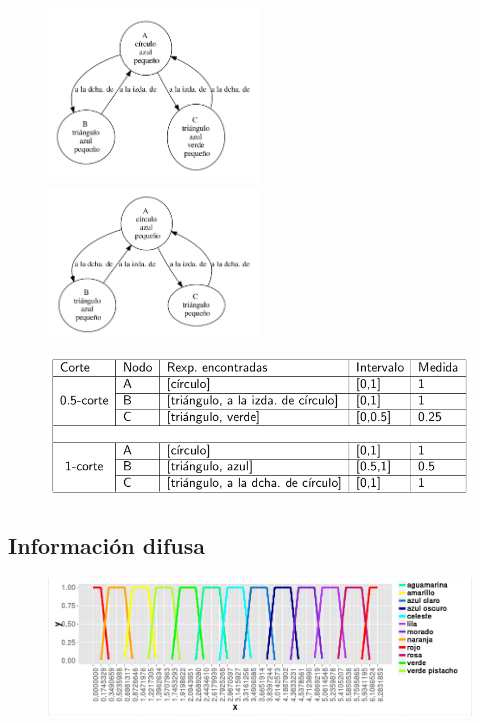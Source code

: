 \documentclass{beamer}
\begin{document}
	\begin{frame}
		\begin{figure}
			\includegraphics[width=0.5\textwidth]{img/riEjemploAlgoritmoDifusoCorte05.png}
			\includegraphics[width=0.5\textwidth]{img/riEjemploAlgoritmoDifusoCorte1.png}
		\end{figure}		
	\end{frame}
	
	\begin{frame}
		\begin{figure}
			\includegraphics[width=1\textwidth]{img/tabla.png}			
		\end{figure}
	\end{frame}
	
	\subsection{Información difusa}
	
	\begin{frame}
		\begin{figure}
			\includegraphics[width=1\textwidth]{img/partitionColor.png}			
		\end{figure}
	\end{frame}
	
\end{document}
